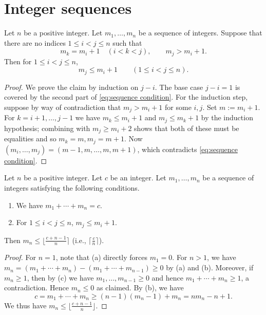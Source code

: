 \section{Integer sequences}

\begin{lemma} \label{lem:sequence argument1}
\leanok
Let $n$ be a positive integer.
Let $m_1,\dots,m_n$ be a sequence of integers.
Suppose that there are no indices $1 \leq i < j \leq n$ such that
\begin{equation} \label{eq:sequence condition}
m_k = m_i + 1 \quad (i < k < j), \qquad m_j > m_i + 1.
\end{equation}
Then for $1 \leq i < j \leq n$,
\[
m_j \leq m_i+1 \qquad (1 \leq i < j \leq n).
\]
\end{lemma}
\begin{proof}
\leanok
We prove the claim by induction on $j-i$.
The base case $j-i=1$ is covered by the second part of \eqref{eq:sequence condition}.
For the induction step, suppose by way of contradiction that $m_j> m_i+1$ for some $i,j$.
Set $m := m_i + 1$.
For $k = i+1, \dots, j-1$ we have $m_{k} \leq m_i+1$ and $m_j \leq m_{k}+1$ by the induction hypothesis;
combining with $m_j \geq m_i + 2$ shows that both of these must be equalities
and so $m_k = m, m_j = m+1$.
Now $(m_i, \dots, m_j) = (m-1, m, \dots, m, m+1)$, which contradicts \eqref{eq:sequence condition}.
\end{proof}

\begin{lemma} \label{lem:sequence argument2}
\leanok
Let $n$ be a positive integer. Let $c$ be an integer.
Let $m_1,\dots,m_n$ be a sequence of integers satisfying the following conditions.
\begin{enumerate}
\item[(a)]
We have $m_1 + \cdots + m_n = c$.
\item[(b)]
For $1 \leq i < j \leq n$, $m_j \leq m_i+1$.
\end{enumerate}
Then $m_n \leq \lfloor \frac{c+n-1}{n} \rceil$ (i.e., $\lceil \frac{c}{n} \rceil$).
\end{lemma}
\begin{proof}
\leanok
For $n = 1$, note that (a) directly forces $m_1 = 0$.
For $n > 1$, we have $m_n = (m_1 + \cdots + m_n) - (m_1 + \cdots + m_{n-1}) \geq 0$ by (a) and (b).
Moreover, if $m_n \geq 1$, then by (c) we have $m_1,\dots,m_{n-1} \geq 0$ and hence
$m_1 + \cdots + m_n \geq 1$, a contradiction. Hence $m_n \leq 0$ as claimed.
By (b), we have 
\[
c = m_1 + \cdots + m_n \geq (n-1)(m_n - 1) + m_n = nm_n - n + 1.
\]
We thus have $m_n \leq \lfloor \frac{c+n-1}{n}\rfloor$.

\end{proof}

